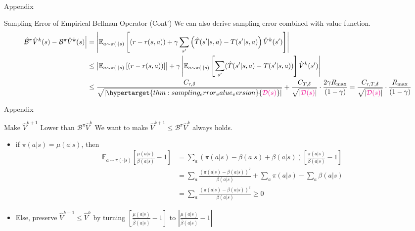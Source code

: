 \documentclass[11pt]{beamer}
\newcommand{\mbb}[1]{\mathbb{#1}}
\newcommand{\mc}[1]{\mathcal{#1}}
\newcommand{\abs}[1]{\left\lvert #1 \right\rvert}
\begin{document}
\begin{frame}{Appendix}
  \begin{block}{Sampling Error of Empirical Bellman Operator (Cont')}
    We can also derive sampling error combined with value function.
    \[
      \begin{aligned}
      \abs{\hat{\mc{B}}^\pi \hat{V}^k(s) - \mc{B}^\pi \hat{V}^k(s)} &= \abs{\mbb{E}_{a \sim \pi(\cdot|s)}\left[(r-r(s,a)) + \gamma \sum_{s^\prime} \left( \hat{T}(s^\prime|s,a) - T(s^\prime|s,a) \right) \hat{V}^k(s^\prime) \right]}\\
      &\leq \abs{\mbb{E}_{a \sim \pi(\cdot|s)} \left[(r - r(s,a))\right]} + \gamma \abs{\mbb{E}_{a \sim \pi(\cdot|s)}\left[\sum_{s^\prime}(\hat{T}(s^\prime|s,a) - T(s^\prime|s,a))\right]\hat{V}^k(s^\prime)}\\
      &\leq \frac{C_{r,\delta}}{\sqrt{\abs{\hypertarget{thm:sampling_error_value_version}{\textcolor{magenta}{\mc{D}(s)}}}}} + \frac{C_{T,\delta}}{\sqrt{\abs{\textcolor{magenta}{\mc{D}(s)}}}} \cdot \frac{ 2\gamma R_{\text{max}}}{(1-\gamma)} = \frac{C_{r,T,\delta}}{\sqrt{\abs{\textcolor{magenta}{\mc{D}(s)}}}} \cdot \frac{R_{\text{max}}}{(1-\gamma)}
      \end{aligned}
    \]
  \end{block}
\end{frame}

\begin{frame}{Appendix}
    \hypertarget{thm:2_underestimate}{\begin{block}{Make $\hat{V}^{k+1}$ Lower than $\mc{B}^\pi \hat{V}^{k}$}
    We want to make $\hat{V}^{k+1} \leq \mc{B}^{\pi}\hat{V}^{k}$ always holds.
    \begin{itemize}
      \item if $\pi(a|s) = \mu(a|s)$, then 
      \[
      \begin{aligned}
      \mbb{E}_{a \sim \pi(\cdot|s)}\left[\frac{\mu(a|s)}{\beta(a|s)}-1 \right] &= \sum_a (\pi(a|s) - \beta (a|s)+ \beta(a|s)) \left[\frac{\pi(a|s)}{\beta(a|s)}-1 \right] \\
      & = \sum_a \frac{(\pi(a|s) - \beta(a|s))^2}{\beta(a|s)} + \sum_a \pi(a|s) - \sum_a \beta(a|s) \\
      & = \sum_a \frac{(\pi(a|s) - \beta(a|s))^2}{\beta(a|s)} \geq 0
      \end{aligned}
     \]
     \item Else, preserve $\hat{V}^{k+1} \leq \hat{V}^{k}$ by turning $\left[\frac{\mu(a|s)}{\hat{\beta}(a|s)} -1\right]$ to \hypertarget{thm:2_absolute}{$\abs{\frac{\mu(a|s)}{\hat{\beta}(a|s)}-1}$}
    \end{itemize}
  \end{block}}

\end{frame}
\end{document}
